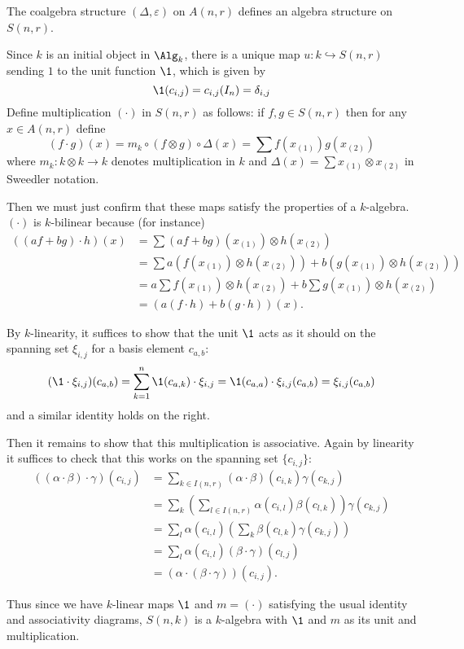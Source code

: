 \documentclass[12pt]{article}
\begin{document}
\begin{lem}
	The coalgebra structure $(\Delta,\varepsilon)$ on $A(n,r)$ defines an algebra structure on $S(n,r)$.
\end{lem}
\begin{prf}
	Since $k$ is an initial object in $\Alg_k$, there is a unique map $u:k\hookrightarrow S(n,r)$ sending $1$ to the unit function $\1$, which is given by 
	\[\1(c_{i,j})=c_{i,j}(I_n)=\delta_{i,j}\]
	Define multiplication $(\cdot)$ in $S(n,r)$ as follows: if $f,g\in S(n,r)$ then for any $x\in A(n,r)$ define 
	\[(f\cdot g)(x)=m_k\circ (f\otimes g)\circ \Delta(x)=\sum f(x_{(1)})g(x_{(2)})\]
	where $m_k:k\otimes k\to k$ denotes multiplication in $k$ and $\Delta(x)=\sum x_{(1)}\otimes x_{(2)}$ in Sweedler notation.

	Then we must just confirm that these maps satisfy the properties of a $k$-algebra. $(\cdot)$ is $k$-bilinear because (for instance)
	\begin{align*}
		((af+bg)\cdot h)(x)&=\sum (af+bg)(x_{(1)})\otimes h(x_{(2)})\\
		&=\sum a(f(x_{(1)})\otimes h(x_{(2)}))+b(g(x_{(1)})\otimes h(x_{(2)}))\\
		&= a\sum f(x_{(1)})\otimes h(x_{(2)})+ b\sum g(x_{(1)})\otimes h(x_{(2)})\\
		&=(a(f\cdot h)+b(g\cdot h))(x).
	\end{align*}
	
	By $k$-linearity, it suffices to show that the unit $\1$ acts as it should on the spanning set $\xi_{i,j}$ for a basis element $c_{a,b}$:
	\[(\1\cdot \xi_{i,j})(c_{a,b})=\sum_{k=1}^n \1(c_{a,k})\cdot\xi_{i,j}=\1(c_{a,a})\cdot\xi_{i,j}(c_{a,b})=\xi_{i,j}(c_{a,b})\]
	and a similar identity holds on the right.

	Then it remains to show that this multiplication is associative. Again by linearity it suffices to check that this works on the spanning set $\{c_{i,j}\}$:
	\begin{align*}
		((\alpha\cdot \beta)\cdot\gamma)(c_{i,j})&=\sum_{k\in I(n,r)}(\alpha\cdot\beta)(c_{i,k})\gamma(c_{k,j})\\
		&=\sum_k\left(\sum_{l\in I(n,r)}\alpha(c_{i,l})\beta(c_{l,k})\right)\gamma(c_{k,j})\\
		&=\sum_l\alpha(c_{i,l})\left(\sum_k \beta(c_{l,k})\gamma(c_{k,j})\right)\\
		&=\sum_l\alpha(c_{i,l})(\beta\cdot\gamma)(c_{l,j})\\
		&=(\alpha\cdot(\beta\cdot\gamma))(c_{i,j}).
	\end{align*}

	Thus since we have $k$-linear maps $\1$ and $m=(\cdot)$ satisfying the usual identity and associativity diagrams, $S(n,k)$ is a $k$-algebra 
	with $\1$ and $m$ as its unit and multiplication.
\end{prf}
\end{document}
